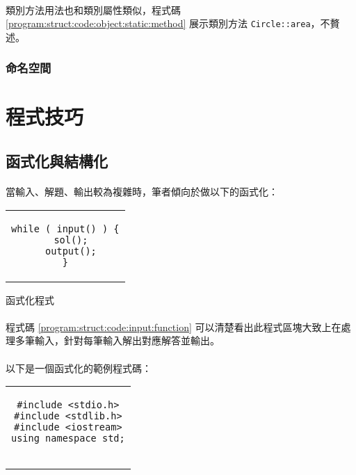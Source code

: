 \documentclass[12pt,a4paper,oneside]{report}
\begin{document}
\begin{CJK}{UTF8}{bkai}
\paragraph{}類別方法用法也和類別屬性類似，程式碼 \ref{program:struct:code:object:static:method} 展示類別方法 \lstinline!Circle::area!，不贅述。

\subsubsection{命名空間}

\section{程式技巧}

\subsection{函式化與結構化}

\paragraph{}當輸入、解題、輸出較為複雜時，筆者傾向於做以下的函式化：

\begin{code}[h!]
\centering
\begin{tabular}{c}
\begin{lstlisting}
while ( input() ) {
  sol();
  output();
}
\end{lstlisting}
\end{tabular}
\caption{函式化程式}
\label{program:struct:code:input:function}
\end{code}

\paragraph{}程式碼 \ref{program:struct:code:input:function} 可以清楚看出此程式區塊大致上在處理多筆輸入，針對每筆輸入解出對應解答並輸出。
\paragraph{}以下是一個函式化的範例程式碼：

\begin{code}[h!]
\centering
\begin{tabular}{c}
\begin{lstlisting}
#include <stdio.h>
#include <stdlib.h>
#include <iostream>
using namespace std;


\end{lstlisting}
\end{tabular}
\end{code}
\end{CJK}
\end{document}
